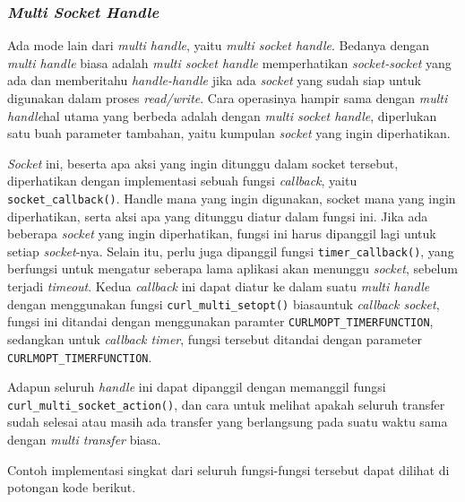 \subsubsection{\textit{Multi Socket Handle}}
\label{sec:cmodules-libcurl-handlemultisocket}

Ada mode lain dari \textit{multi handle}, yaitu \textit{multi socket handle}. Bedanya dengan \textit{multi handle} biasa adalah \textit{multi socket handle} memperhatikan \textit{socket-socket} yang ada dan memberitahu \textit{handle-handle} jika ada \textit{socket} yang sudah siap untuk digunakan dalam proses \textit{read/write}. Cara operasinya hampir sama dengan \textit{multi handle}\textemdash hal utama yang berbeda adalah dengan \textit{multi socket handle}, diperlukan satu buah parameter tambahan, yaitu kumpulan \textit{socket} yang ingin diperhatikan.

\textit{Socket} ini, beserta apa aksi yang ingin ditunggu dalam socket tersebut, diperhatikan dengan implementasi sebuah fungsi \textit{callback}, yaitu \verb|socket_callback()|. Handle mana yang ingin digunakan, socket mana yang ingin diperhatikan, serta aksi apa yang ditunggu diatur dalam fungsi ini. Jika ada beberapa \textit{socket} yang ingin diperhatikan, fungsi ini harus dipanggil lagi untuk setiap \textit{socket}-nya. Selain itu, perlu juga dipanggil fungsi \verb|timer_callback()|, yang berfungsi untuk mengatur seberapa lama aplikasi akan menunggu \textit{socket}, sebelum terjadi \textit{timeout}. Kedua \textit{callback} ini dapat diatur ke dalam suatu \textit{multi handle} dengan menggunakan fungsi \verb|curl_multi_setopt()| biasa\textemdash untuk \textit{callback socket}, fungsi ini ditandai dengan menggunakan paramter \verb|CURLMOPT_TIMERFUNCTION|, sedangkan untuk \textit{callback timer}, fungsi tersebut ditandai dengan parameter \verb|CURLMOPT_TIMERFUNCTION|.

Adapun seluruh \textit{handle} ini dapat dipanggil dengan memanggil fungsi \verb|curl_multi_socket_action()|, dan cara untuk melihat apakah seluruh transfer sudah selesai atau masih ada transfer yang berlangsung pada suatu waktu sama dengan \textit{multi transfer} biasa.

Contoh implementasi singkat dari seluruh fungsi-fungsi tersebut dapat dilihat di potongan kode berikut.

